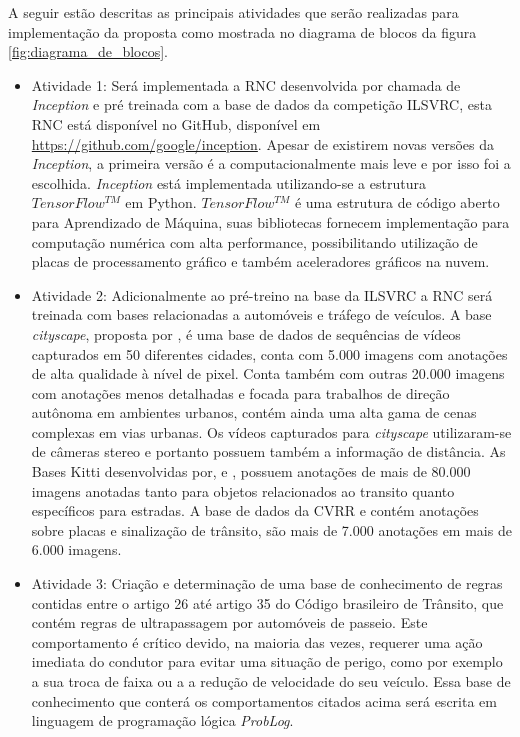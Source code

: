 \documentclass[
	12pt,				%
    oneside,			%
	a4paper,			%
	english,			%
	french,				%
	spanish,			%
	brazil,				%
	]{abntex2}
\begin{document}
A seguir estão descritas as principais atividades que serão realizadas para implementação da proposta como mostrada no diagrama de blocos da figura \ref{fig:diagrama_de_blocos}. 


\begin{itemize}
   

 \item Atividade 1: Será implementada a RNC desenvolvida por  chamada de \textit{Inception} e pré treinada com a base de dados da competição ILSVRC, esta RNC está disponível no GitHub, disponível em \url{https://github.com/google/inception}. Apesar de existirem novas versões da \textit{Inception}, a primeira versão é a computacionalmente mais leve e por isso foi a escolhida. \textit{Inception} está implementada utilizando-se a estrutura $TensorFlow^{TM}$ em Python. $TensorFlow^{TM}$ é uma estrutura de código aberto para Aprendizado de Máquina, suas bibliotecas fornecem implementação para computação numérica com alta performance, possibilitando utilização de placas de processamento gráfico e também aceleradores gráficos na nuvem. 
 

 \item Atividade 2: Adicionalmente ao pré-treino na base da ILSVRC a RNC será treinada com bases relacionadas a automóveis e tráfego de veículos.\newline
 A base \textit{cityscape}, proposta por , é uma base de dados de sequências de vídeos capturados em 50 diferentes cidades, conta com 5.000 imagens com anotações de alta qualidade à nível de pixel. Conta também com outras 20.000 imagens com anotações menos detalhadas e focada para trabalhos de direção autônoma em ambientes urbanos, contém ainda uma alta gama de cenas complexas em vias urbanas. Os vídeos capturados para \textit{cityscape} utilizaram-se de câmeras stereo e portanto possuem também a informação de distância.\newline
 As Bases Kitti desenvolvidas por,  e , possuem anotações de mais de 80.000 imagens anotadas tanto para objetos relacionados ao transito quanto específicos para estradas.\newline
 A base de dados da CVRR  e  contém anotações sobre placas e sinalização de trânsito, são mais de 7.000 anotações em mais de 6.000 imagens.
 
 \item Atividade 3: Criação e determinação de uma base de conhecimento de regras contidas entre o artigo 26 até artigo 35 do Código brasileiro de Trânsito, que contém regras de ultrapassagem por automóveis de passeio. Este comportamento é crítico devido, na maioria das vezes, requerer uma ação imediata do condutor para evitar uma situação de perigo, como por exemplo a sua troca de faixa ou a a redução de velocidade do seu veículo. Essa base de conhecimento que conterá os comportamentos citados acima será escrita em linguagem de programação lógica \textit{ProbLog}. 
 

\end{itemize}
\end{document}

